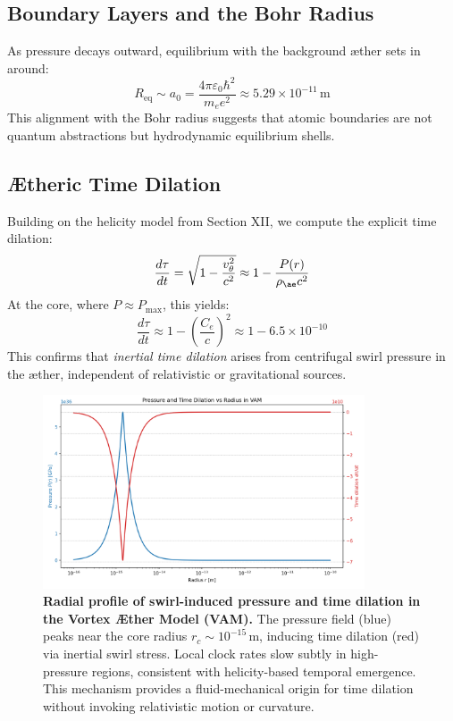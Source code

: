 \subsection{Boundary Layers and the Bohr Radius}

As pressure decays outward, equilibrium with the background æther sets in around:
\begin{equation}
    R_{\text{eq}} \sim a_0 = \frac{4\pi \varepsilon_0 \hbar^2}{m_e e^2} \approx 5.29 \times 10^{-11} \, \text{m}
\end{equation}
This alignment with the Bohr radius suggests that atomic boundaries are not quantum abstractions but hydrodynamic equilibrium shells.

\subsection{Ætheric Time Dilation}

Building on the helicity model from Section XII, we compute the explicit time dilation:
\begin{equation}
    \frac{d\tau}{dt} = \sqrt{1 - \frac{v_\theta^2}{c^2}} \approx 1 - \frac{P(r)}{\rho_{\ae} c^2}
\end{equation}
At the core, where \( P \approx P_{\text{max}} \), this yields:
\begin{equation}
    \frac{d\tau}{dt} \approx 1 - \left(\frac{C_e}{c}\right)^2 \approx 1 - 6.5 \times 10^{-10}
\end{equation}
This confirms that \emph{inertial time dilation} arises from centrifugal swirl pressure in the æther, independent of relativistic or gravitational sources.

\begin{figure}[H]
    \centering
    \includegraphics[width=0.85\textwidth]{images/TimeDilationCore}
    \caption{%
        \textbf{Radial profile of swirl-induced pressure and time dilation in the Vortex Æther Model (VAM).}
        The pressure field (blue) peaks near the core radius \( r_c \sim 10^{-15} \,\mathrm{m} \), inducing time dilation (red) via inertial swirl stress. Local clock rates slow subtly in high-pressure regions, consistent with helicity-based temporal emergence. This mechanism provides a fluid-mechanical origin for time dilation without invoking relativistic motion or curvature.
    }
    \label{fig:time_dilation_profile}
\end{figure}

